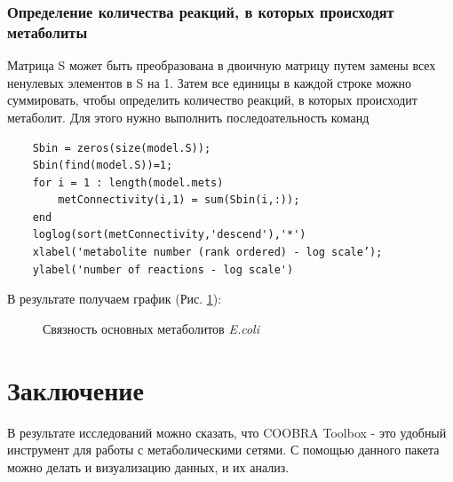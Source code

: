 \documentclass[a4paper, 12pt]{article}
\begin{document}
\subsubsection{Определение количества реакций, в которых происходят метаболиты}

Матрица S может быть преобразована в двоичную матрицу путем замены всех ненулевых элементов в S на 1. Затем все единицы в каждой строке можно суммировать, чтобы определить количество реакций, в которых происходит метаболит. Для этого нужно выполнить последоательность команд
\begin{lstlisting}
    Sbin = zeros(size(model.S));
    Sbin(find(model.S))=1;
    for i = 1 : length(model.mets)
        metConnectivity(i,1) = sum(Sbin(i,:));
    end
    loglog(sort(metConnectivity,'descend'),'*')
    xlabel('metabolite number (rank ordered) - log scale’);
    ylabel('number of reactions - log scale')
\end{lstlisting}

В результате получаем график (Рис. \ref{fig:det_numb}):
\begin{figure}[H]
    \caption{Связность основных метаболитов \textit{E.coli}}
    \label{fig:det_numb}
\end{figure}

\newpage
\section*{Заключение}

В результате исследований можно сказать, что COOBRA Toolbox - это удобный инструмент для работы с метаболическими сетями. С помощью данного пакета можно делать и визуализацию данных, и их анализ. 
\end{document}
